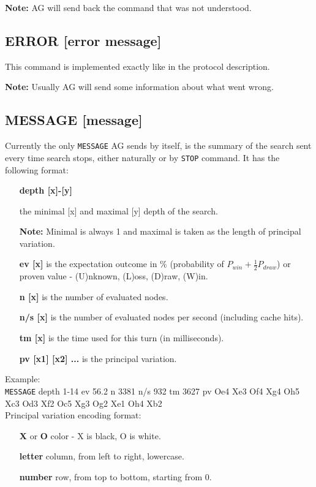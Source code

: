 \documentclass[12pt,a4paper]{article}
\begin{document}
\textbf{Note:} AG will send back the command that was not understood.


\subsection{ERROR [error message]}
\label{cmd_error}
This command is implemented exactly like in the protocol description.

\textbf{Note:} Usually AG will send some information about what went wrong.


\subsection{MESSAGE [message]}
\label{cmd_message}
Currently the only \texttt{MESSAGE} AG sends by itself, is the summary of the search sent every time search stops, either naturally or by \texttt{STOP} command. It has the following format:\\
\begin{enumerate}[leftmargin=7.5em]
\item[\textbf{depth [x]-[y]}]{the minimal [x] and maximal [y] depth of the search.

\textbf{Note:} Minimal is always 1 and maximal is taken as the length of principal variation.}
\item[\textbf{ev [x]}]{is the expectation outcome in {\%} (probability of $P_{win} + \frac{1}{2}P_{draw}$) or proven value - (U)nknown, (L)oss, (D)raw, (W)in.}
\item[\textbf{n [x]}]{is the number of evaluated nodes.}
\item[\textbf{n/s [x]}]{is the number of evaluated nodes per second (including cache hits).}
\item[\textbf{tm [x]}]{is the time used for this turn (in milliseconds).}
\item[\textbf{pv [x1] [x2] ...}]{is the principal variation.}
\end{enumerate}

Example:\\
\texttt{MESSAGE} depth 1-14 ev 56.2 n 3381 n/s 932 tm 3627 pv Oe4 Xe3 Of4 Xg4 Oh5 Xc3 Od3 Xf2 Oc5 Xg3 Og2 Xe1 Oh4 Xb2 \\

Principal variation encoding format:
\begin{enumerate}[leftmargin=7.5em]
\item[\textbf{X} or \textbf{O}]{color - X is black, O is white.}
\item[\textbf{letter}]{column, from left to right, lowercase.}
\item[\textbf{number}]{row, from top to bottom, starting from 0.}
\end{enumerate}
\end{document}
